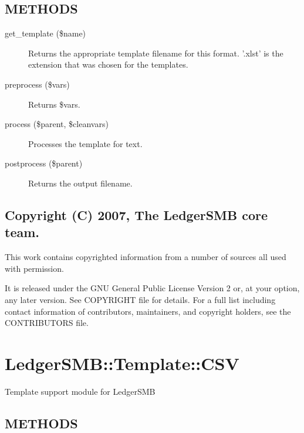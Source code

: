 \begin{description}
\begin{description}
\begin{description}
\begin{description}
\begin{description}
\begin{description}
\begin{description}
\begin{description}
\begin{description}
\begin{description}
\subsection*{METHODS\label{LedgerSMB::Template::ODS_METHODS}}
\begin{description}

\item[{get\_template (\$name)}] \mbox{}

Returns the appropriate template filename for this format.  '.xlst' is the
extension that was chosen for the templates.


\item[{preprocess (\$vars)}] \mbox{}

Returns \$vars.


\item[{process (\$parent, \$cleanvars)}] \mbox{}

Processes the template for text.


\item[{postprocess (\$parent)}] \mbox{}

Returns the output filename.

\end{description}
\subsection*{Copyright (C) 2007, The LedgerSMB core team.\label{LedgerSMB::Template::ODS_Copyright_C_2007_The_LedgerSMB_core_team_}}


This work contains copyrighted information from a number of sources all used
with permission.



It is released under the GNU General Public License Version 2 or, at your 
option, any later version.  See COPYRIGHT file for details.  For a full list 
including contact information of contributors, maintainers, and copyright 
holders, see the CONTRIBUTORS file.

\section{LedgerSMB::Template::CSV\label{LedgerSMB::Template::CSV}}


Template support module for LedgerSMB

\subsection*{METHODS\label{LedgerSMB::Template::CSV_METHODS}}
\begin{description}


\end{description}
\end{description}
\end{description}
\end{description}
\end{description}
\end{description}
\end{description}
\end{description}
\end{description}
\end{description}
\end{description}
